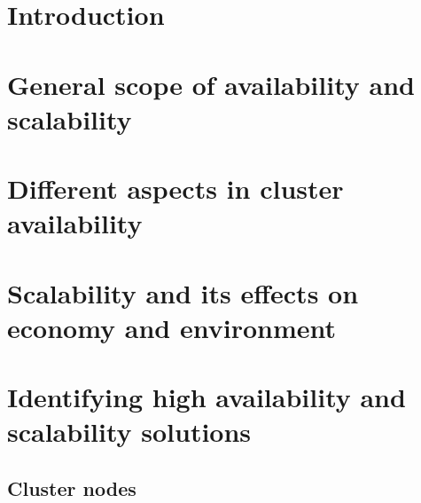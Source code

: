 \documentclass[12pt]{report}
\begin{document}
\tableofcontents %

\newpage %

\chapter{Introduction} %

\chapter{General scope of availability and scalability}

\chapter{Different aspects in cluster availability}

\chapter{Scalability and its effects on economy and environment}

\chapter{Identifying high availability and scalability solutions}
\section{Cluster nodes}
\end{document}
